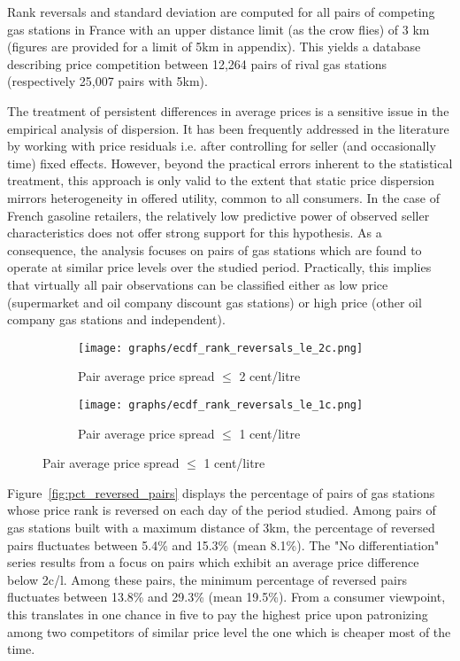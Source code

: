 \documentclass[english]{article}
\begin{document}
Rank reversals and standard deviation are computed for all pairs of competing gas stations in France with an upper distance limit (as the crow flies) of 3 km (figures are provided for a limit of 5km in appendix). This yields a database describing price competition between 12,264 pairs of rival gas stations (respectively 25,007 pairs with 5km).

The treatment of persistent differences in average prices is a sensitive issue in the empirical analysis of dispersion. It has been frequently addressed in the literature by working with price residuals i.e. after controlling for seller (and occasionally time) fixed effects. However, beyond the practical errors inherent to the statistical treatment, this approach is only valid to the extent that static price dispersion mirrors heterogeneity in offered utility, common to all consumers. In the case of French gasoline retailers, the relatively low predictive power of observed seller characteristics does not offer strong support for this hypothesis. As a consequence, the analysis focuses on pairs of gas stations which are found to operate at similar price levels over the studied period. Practically, this implies that virtually all pair observations can be classified either as low price (supermarket and oil company discount gas stations) or high price (other oil company gas stations and independent).

\begin{figure}[H]
\centering
\caption{Empirical distribution functions of rank reversals (raw prices)}
\label{tab:ecdf_rr_distance}
\begin{subfigure}{.49\textwidth}
\centering
\texttt{[image: graphs/ecdf\_rank\_reversals\_le\_2c.png]}
\caption[short]{Pair average price spread $\le$ 2 cent/litre}
\end{subfigure}
\begin{subfigure}{.49\textwidth}
\centering
\texttt{[image: graphs/ecdf\_rank\_reversals\_le\_1c.png]}
\caption[short]{Pair average price spread $\le$ 1 cent/litre}
\end{subfigure}
\end{figure}

Figure~\ref{fig:pct_reversed_pairs} displays the percentage of pairs of gas stations whose price rank is reversed on each day of the period studied. Among pairs of gas stations built with a maximum distance of 3km, the percentage of reversed pairs fluctuates between 5.4\% and 15.3\%  (mean 8.1\%). The "No differentiation" series results from a focus on pairs which exhibit an average price difference below 2c/l. Among these pairs, the minimum percentage of reversed pairs fluctuates between 13.8\% and 29.3\% (mean 19.5\%). From a consumer viewpoint, this translates in one chance in five to pay the highest price upon patronizing among two competitors of similar price level the one which is cheaper most of the time.
\end{document}
